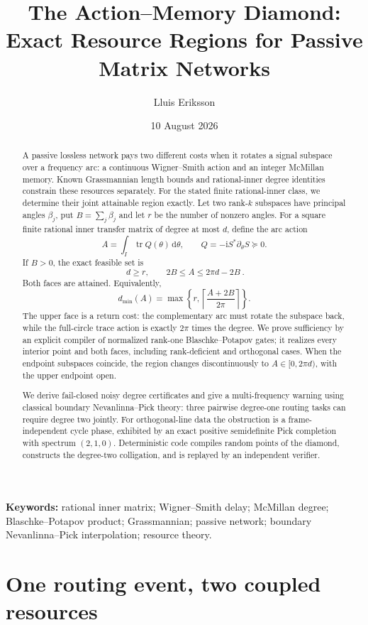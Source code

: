\documentclass[11pt]{article}
\title{The Action--Memory Diamond:\\
Exact Resource Regions for Passive Matrix Networks}
\author{Lluis Eriksson}
\date{10 August 2026}
\theoremstyle{definition}
\theoremstyle{remark}
\newcommand{\tr}{\operatorname{tr}}
\newcommand{\dd}{\mathrm d}
\begin{document}
\maketitle

\begin{abstract}
A passive lossless network pays two different costs when it rotates a signal
subspace over a frequency arc: a continuous Wigner--Smith action and an
integer McMillan memory.  Known Grassmannian length bounds and rational-inner
degree identities constrain these resources separately.  For the stated
finite rational-inner class, we determine their joint attainable region
exactly.  Let
two rank-$k$ subspaces have principal angles $\beta_j$, put
$B=\sum_j\beta_j$ and let $r$ be the number of nonzero angles.  For a square
finite rational inner transfer matrix of degree at most $d$, define the arc
action
\[
 A=\int_I\tr Q(\theta)\,\dd\theta,
 \qquad Q=-\mathrm iS^*\partial_\theta S\succeq0.
\]
If $B>0$, the exact feasible set is
\[
 \boxed{\ d\ge r,\qquad 2B\le A\le2\pi d-2B\ }.
\]
Both faces are attained.  Equivalently,
\[
 d_{\min}(A)=\max\!\left\{r,
 \left\lceil\frac{A+2B}{2\pi}\right\rceil\right\}.
\]
The upper face is a return cost: the complementary arc must rotate the
subspace back, while the full-circle trace action is exactly $2\pi$ times
the degree.  We prove sufficiency by an explicit compiler of normalized
rank-one Blaschke--Potapov gates; it realizes every interior point and both
faces, including rank-deficient and orthogonal cases.  When the endpoint
subspaces coincide, the region changes discontinuously to
$A\in[0,2\pi d)$, with the upper endpoint open.

We derive fail-closed noisy degree certificates and give a multi-frequency
warning using classical boundary Nevanlinna--Pick theory: three pairwise
degree-one routing tasks can require degree two jointly.  For orthogonal-line
data the obstruction is a frame-independent cycle phase, exhibited by an exact positive semidefinite
Pick completion with spectrum $(2,1,0)$.  Deterministic code compiles random
points of the diamond, constructs the degree-two colligation, and is replayed
by an independent verifier.
\end{abstract}

\noindent\textbf{Keywords:} rational inner matrix; Wigner--Smith delay;
McMillan degree; Blaschke--Potapov product; Grassmannian; passive network;
boundary Nevanlinna--Pick interpolation; resource theory.

\section{One routing event, two coupled resources}
\end{document}
